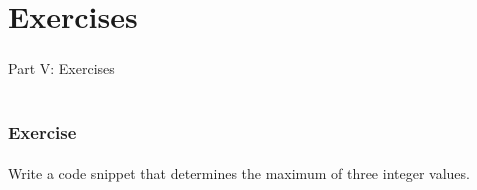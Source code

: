 \documentclass[]{beamer}
\begin{document}
%
%
%
%
%
%
%

 
\section{Exercises}

\begin{frame}
    \frametitle{}
    \framesubtitle{}
    
    \begin{center}
    {\Huge Part V: Exercises}\\
    {\Large ~}
    \end{center}

\end{frame}

\begin{frame}
  \frametitle{Exercise}
  \framesubtitle{}
  
  Write a code snippet that determines the maximum of three integer
  values.

\end{frame}
\end{document}
